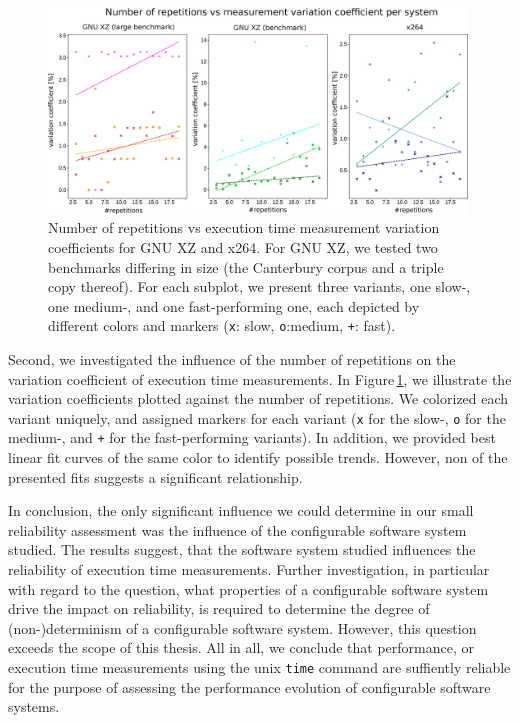 \begin{figure}
\centering
\includegraphics[width=0.99\textwidth]{images/reliability_3.eps}
\caption{Number of repetitions vs execution time measurement variation
coefficients for GNU XZ and x264. For GNU XZ, we tested two benchmarks
differing in size (the Canterbury corpus and a triple copy thereof). For each
subplot, we present three variants, one slow-, one medium-, and one
fast-performing one, each depicted by different colors and markers (\texttt{x}:
slow, \texttt{o}:medium, \texttt{+}: fast).}\label{fig:reliability_3}
\end{figure}

Second, we investigated the influence of the number of repetitions on the
variation coefficient of execution time measurements. In
Figure\,\ref{fig:reliability_3}, we illustrate the variation coefficients
plotted against the number of repetitions. We colorized each variant uniquely,
and assigned markers for each variant (\texttt{x} for the slow-,
{\texttt{o}} for the medium-, and \texttt{+} for the fast-performing variants).
In addition, we provided best linear fit curves of the same color to identify possible
trends. However, non of the presented fits suggests a significant relationship.

In conclusion, the only significant influence we could determine in our small
reliability assessment was the influence of the configurable software system
studied. The results suggest, that the software system studied influences the
reliability of execution time measurements. Further investigation, in particular
with regard to the question, what properties of a configurable software system
drive the impact on reliability, is required to determine the degree of
(non-)determinism of a configurable software system. However, this question
exceeds the scope of this thesis. All in all, we conclude that performance, or
execution time measurements using the unix \texttt{time} command are suffiently
reliable for the purpose of assessing the performance evolution of configurable
software systems.



